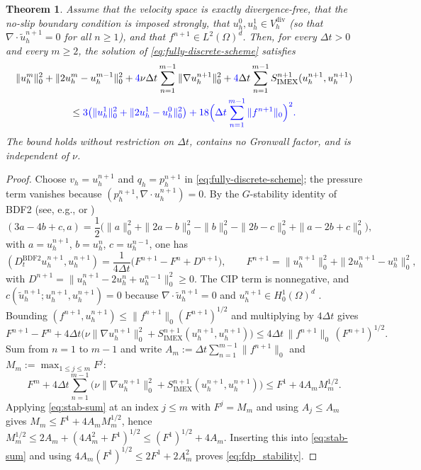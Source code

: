 \documentclass[11pt]{article}
\newtheorem{theorem}{Theorem}
\theoremstyle{remark}\newtheorem{remark}{Remark}
\newcommand{\Vdivh}{V_h^{\mathrm{div}}}
\newcommand{\Dt}{D_t^{\mathrm{BDF2}}}
\newcommand{\tu}{\tilde u_h}
\newcommand{\Simex}{S_{\mathrm{IMEX}}}
\theoremstyle{plain}
\newcommand{\new}[1]{{\color{blue}#1}}
\begin{document}
\begin{theorem}\label{thm:stability}
Assume that the velocity space is exactly divergence-free, that the no-slip boundary condition is imposed strongly, that $u_h^0,u_h^1\in\Vdivh$ (so that $\nabla\cdot\tu^{n+1}=0$ for all $n\ge1$), and that $f^{n+1}\in L^2(\Omega)^d$. \new{Then, for every $\Delta t>0$ and every $m\ge2$,} the solution of \eqref{eq:fully-discrete-scheme} satisfies
\begin{multline}\label{eq:fdp_stability}
\|u_h^m\|_0^2+\|2u_h^m-u_h^{m-1}\|_0^2
+\new{4}\nu\Delta t\sum_{n=1}^{m-1}\|\nabla u_h^{n+1}\|_0^2
+\new{4}\Delta t\sum_{n=1}^{m-1}\Simex^{n+1}(u_h^{n+1},u_h^{n+1})\\
\le\new{3\big(\|u_h^1\|_0^2+\|2u_h^1-u_h^0\|_0^2\big)+18\Big(\Delta t\sum_{n=1}^{m-1}\|f^{n+1}\|_0\Big)^2.}
\end{multline}
\new{The bound holds without restriction on $\Delta t$, contains no Gronwall factor, and is independent of $\nu$.}
\end{theorem}

\begin{proof}
Choose $v_h=u_h^{n+1}$ and $q_h=p_h^{n+1}$ in \eqref{eq:fully-discrete-scheme}; the pressure term vanishes because $(p_h^{n+1},\nabla\cdot u_h^{n+1})=0$. \new{By the $G$-stability identity of BDF2 (see, e.g., \cite[Sec.~V.6]{HW96} or \cite{GAN23})}
\[(3a-4b+c,a)=\frac12\big(\|a\|_0^2+\|2a-b\|_0^2-\|b\|_0^2-\|2b-c\|_0^2+\|a-2b+c\|_0^2\big),\]
with $a=u_h^{n+1}$, $b=u_h^n$, $c=u_h^{n-1}$, one has
\[
(\Dt u_h^{n+1},u_h^{n+1})=\frac1{4\Delta t}\big(F^{n+1}-F^n+D^{n+1}\big),\qquad
F^{n+1}=\|u_h^{n+1}\|_0^2+\|2u_h^{n+1}-u_h^n\|_0^2,
\]
with $D^{n+1}=\|u_h^{n+1}-2u_h^n+u_h^{n-1}\|_0^2\ge0$. The CIP term is nonnegative, and \new{$c(\tu^{n+1};u_h^{n+1},u_h^{n+1})=0$ because $\nabla\cdot\tu^{n+1}=0$ and $u_h^{n+1}\in H^1_0(\Omega)^d$ \cite{GR86,Joh16}}. \new{Bounding $(f^{n+1},u_h^{n+1})\le\|f^{n+1}\|_0(F^{n+1})^{1/2}$ and multiplying by $4\Delta t$ gives
\[
F^{n+1}-F^n+4\Delta t\big(\nu\|\nabla u_h^{n+1}\|_0^2+\Simex^{n+1}(u_h^{n+1},u_h^{n+1})\big)\le4\Delta t\,\|f^{n+1}\|_0\,(F^{n+1})^{1/2}.
\]
Sum from $n=1$ to $m-1$ and write $A_m:=\Delta t\sum_{n=1}^{m-1}\|f^{n+1}\|_0$ and $M_m:=\max_{1\le j\le m}F^j$:
\begin{equation}\label{eq:stab-sum}
F^m+4\Delta t\sum_{n=1}^{m-1}\big(\nu\|\nabla u_h^{n+1}\|_0^2+\Simex^{n+1}(u_h^{n+1},u_h^{n+1})\big)\le F^1+4A_mM_m^{1/2}.
\end{equation}
Applying \eqref{eq:stab-sum} at an index $j\le m$ with $F^j=M_m$ and using $A_j\le A_m$ gives $M_m\le F^1+4A_mM_m^{1/2}$, hence $M_m^{1/2}\le2A_m+(4A_m^2+F^1)^{1/2}\le(F^1)^{1/2}+4A_m$. Inserting this into \eqref{eq:stab-sum} and using $4A_m(F^1)^{1/2}\le2F^1+2A_m^2$ proves \eqref{eq:fdp_stability}.}
\end{proof}
\end{document}
